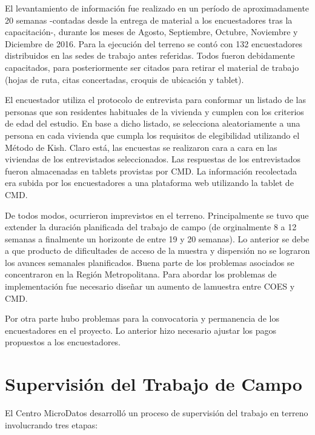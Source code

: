 \documentclass[
]{book}
\begin{document}
El levantamiento de información fue realizado en un período de
aproximadamente 20 semanas -contadas desde la entrega de material a los
encuestadores tras la capacitación-, durante los meses de Agosto,
Septiembre, Octubre, Noviembre y Diciembre de 2016. Para la ejecución
del terreno se contó con 132 encuestadores distribuidos en las sedes de
trabajo antes referidas. Todos fueron debidamente capacitados, para
posteriormente ser citados para retirar el material de trabajo (hojas de
ruta, citas concertadas, croquis de ubicación y tablet).

El encuestador utiliza el protocolo de entrevista para conformar un
listado de las personas que son residentes habituales de la vivienda y
cumplen con los criterios de edad del estudio. En base a dicho listado,
se selecciona aleatoriamente a una persona en cada vivienda que cumpla
los requisitos de elegibilidad utilizando el Método de Kish. Claro está,
las encuestas se realizaron cara a cara en las viviendas de los
entrevistados seleccionados. Las respuestas de los entrevistados fueron
almacenadas en tablets provistas por CMD. La información recolectada era
subida por los encuestadores a una plataforma web utilizando la tablet
de CMD.

De todos modos, ocurrieron imprevistos en el terreno. Principalmente se
tuvo que extender la duración planificada del trabajo de campo (de
orginalmente 8 a 12 semanas a finalmente un horizonte de entre 19 y 20
semanas). Lo anterior se debe a que producto de dificultades de acceso
de la muestra y dispersión no se lograron los avances semanales
planificados. Buena parte de los problemas asociados se concentraron en
la Región Metropolitana. Para abordar los problemas de implementación
fue necesario diseñar un aumento de lamuestra entre COES y CMD.

Por otra parte hubo problemas para la convocatoria y permanencia de los
encuestadores en el proyecto. Lo anterior hizo necesario ajustar los
pagos propuestos a los encuestadores.

\hypertarget{supervisiuxf3n-del-trabajo-de-campo}{%
\section{Supervisión del Trabajo de
Campo}\label{supervisiuxf3n-del-trabajo-de-campo}}

El Centro MicroDatos desarrolló un proceso de supervisión del trabajo en
terreno involucrando tres etapas:
\end{document}
